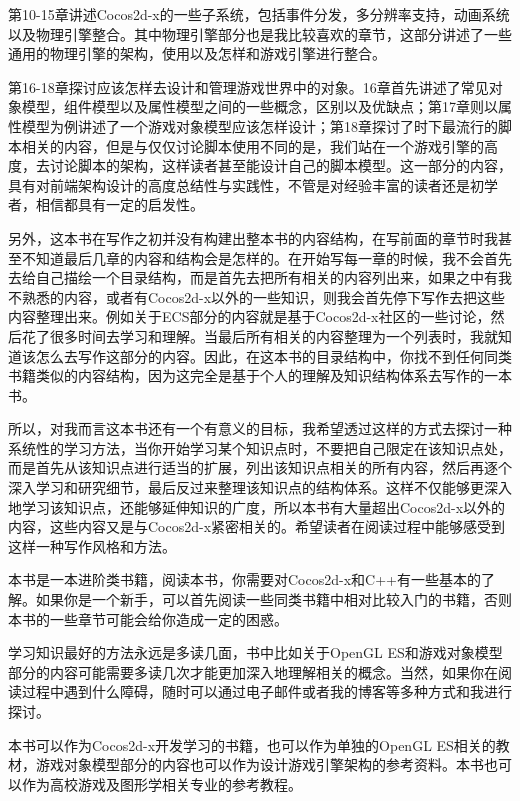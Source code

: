 第10-15章讲述Cocos2d-x的一些子系统，包括事件分发，多分辨率支持，动画系统以及物理引擎整合。其中物理引擎部分也是我比较喜欢的章节，这部分讲述了一些通用的物理引擎的架构，使用以及怎样和游戏引擎进行整合。

第16-18章探讨应该怎样去设计和管理游戏世界中的对象。16章首先讲述了常见对象模型，组件模型以及属性模型之间的一些概念，区别以及优缺点；第17章则以属性模型为例讲述了一个游戏对象模型应该怎样设计；第18章探讨了时下最流行的脚本相关的内容，但是与仅仅讨论脚本使用不同的是，我们站在一个游戏引擎的高度，去讨论脚本的架构，这样读者甚至能设计自己的脚本模型。这一部分的内容，具有对前端架构设计的高度总结性与实践性，不管是对经验丰富的读者还是初学者，相信都具有一定的启发性。

另外，这本书在写作之初并没有构建出整本书的内容结构，在写前面的章节时我甚至不知道最后几章的内容和结构会是怎样的。在开始写每一章的时候，我不会首先去给自己描绘一个目录结构，而是首先去把所有相关的内容列出来，如果之中有我不熟悉的内容，或者有Cocos2d-x以外的一些知识，则我会首先停下写作去把这些内容整理出来。例如关于ECS部分的内容就是基于Cocos2d-x社区的一些讨论，然后花了很多时间去学习和理解。当最后所有相关的内容整理为一个列表时，我就知道该怎么去写作这部分的内容。因此，在这本书的目录结构中，你找不到任何同类书籍类似的内容结构，因为这完全是基于个人的理解及知识结构体系去写作的一本书。

\begin{fullwidth}
	

所以，对我而言这本书还有一个有意义的目标，我希望透过这样的方式去探讨一种系统性的学习方法，当你开始学习某个知识点时，不要把自己限定在该知识点处，而是首先从该知识点进行适当的扩展，列出该知识点相关的所有内容，然后再逐个深入学习和研究细节，最后反过来整理该知识点的结构体系。这样不仅能够更深入地学习该知识点，还能够延伸知识的广度，所以本书有大量超出Cocos2d-x以外的内容，这些内容又是与Cocos2d-x紧密相关的。希望读者在阅读过程中能够感受到这样一种写作风格和方法。

\end{fullwidth}

本书是一本进阶类书籍，阅读本书，你需要对Cocos2d-x和C++有一些基本的了解。如果你是一个新手，可以首先阅读一些同类书籍中相对比较入门的书籍，否则本书的一些章节可能会给你造成一定的困惑。

学习知识最好的方法永远是多读几面，书中比如关于OpenGL ES和游戏对象模型部分的内容可能需要多读几次才能更加深入地理解相关的概念。当然，如果你在阅读过程中遇到什么障碍，随时可以通过电子邮件或者我的博客等多种方式和我进行探讨。

本书可以作为Cocos2d-x开发学习的书籍，也可以作为单独的OpenGL ES相关的教材，游戏对象模型部分的内容也可以作为设计游戏引擎架构的参考资料。本书也可以作为高校游戏及图形学相关专业的参考教程。

